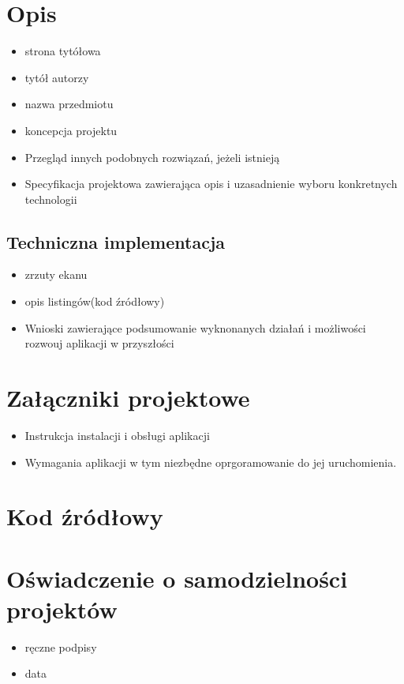 \documentclass[11pt]{article}
\author{placeholder}
\date{\today}
\title{}
\begin{document}
\tableofcontents

\section{Opis}
\label{sec:org6f4b607}
\begin{itemize}
\item strona tytółowa
\item tytół autorzy
\item nazwa przedmiotu
\item koncepcja projektu
\item Przegląd innych podobnych rozwiązań, jeżeli istnieją
\item Specyfikacja projektowa zawierająca opis i uzasadnienie wyboru konkretnych technologii
\end{itemize}
\subsection{Techniczna implementacja}
\label{sec:org8483881}
\begin{itemize}
\item zrzuty ekanu
\item opis listingów(kod źródłowy)
\item Wnioski zawierające podsumowanie wyknonanych działań i możliwości rozwouj aplikacji w przyszłości
\end{itemize}
\section{Załączniki projektowe}
\label{sec:org0a9e877}
\begin{itemize}
\item Instrukcja instalacji i obsługi aplikacji
\item Wymagania aplikacji w tym niezbędne oprgoramowanie do jej uruchomienia.
\end{itemize}
\section{Kod źródłowy}
\label{sec:org04acd70}
\section{Oświadczenie o samodzielności projektów}
\label{sec:org3a82fe3}
\begin{itemize}
\item ręczne podpisy
\item data
\end{itemize}
\end{document}
